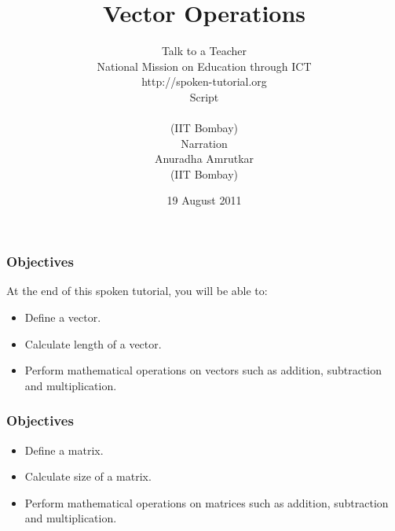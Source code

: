 \documentclass[17pt]{beamer}
\begin{document}
\sffamily 
\bfseries
\title
[ Vector Operations
\hspace{0.5cm}
\insertframenumber/\inserttotalframenumber]
{\normalsize Vector Operations}
\vspace{-1 cm}
\author[ Script-Shalini \\ Narration-Anuradha]{{ \small Talk to a Teacher \\ National Mission on Education through ICT \\ http://spoken-tutorial.org }\\{\scriptsize Script }\\ \vspace{-0.2cm}{\small Shalini Shrivastava}\vspace{-0.3cm} \\{\scriptsize (IIT Bombay) } \vspace{-0.2cm}\\{\scriptsize Narration} \vspace{-0.2cm}\\  {\small Anuradha Amrutkar}\vspace{-0.3cm} \\{\scriptsize (IIT Bombay)}\vspace{-1 cm}}

\date{ \scriptsize 19 August 2011}

\begin{frame}
\maketitle
\end{frame}

\begin{frame}[fragile]
\frametitle{Objectives}
At the end of this spoken tutorial, you will be able to:\pause
\begin{itemize} [<+-|alert@+>]
\item Define a vector.
\item Calculate length of a vector.
\item Perform mathematical operations on vectors such as addition, subtraction and multiplication.

\end{itemize}
\end{frame}

\begin{frame}[fragile]
\frametitle{Objectives}
\begin{itemize} [<+-|alert@+>]
\item Define a matrix.
\item Calculate size of a matrix.
\item Perform mathematical operations on matrices such as addition, subtraction and multiplication.
\end{itemize}
\end{frame}
\end{document}
